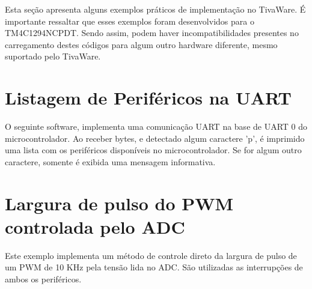 Esta seção apresenta alguns exemplos práticos de implementação no TivaWare. É importante ressaltar que esses exemplos foram desenvolvidos para o TM4C1294NCPDT. Sendo assim, podem haver incompatibilidades presentes no carregamento destes códigos para algum outro hardware diferente, mesmo suportado pelo TivaWare.

\minitocsection

\section{Listagem de Periféricos na UART}

O seguinte software, implementa uma comunicação UART na base de UART 0 do microcontrolador. Ao receber bytes, e detectado algum caractere 'p', é imprimido uma lista com os periféricos disponíveis no microcontrolador. Se for algum outro caractere, somente é exibida uma mensagem informativa.



\section{Largura de pulso do PWM controlada pelo ADC}

Este exemplo implementa um método de controle direto da largura de pulso de um PWM de 10 KHz  pela tensão lida no ADC. São utilizadas as interrupções de ambos os periféricos.

